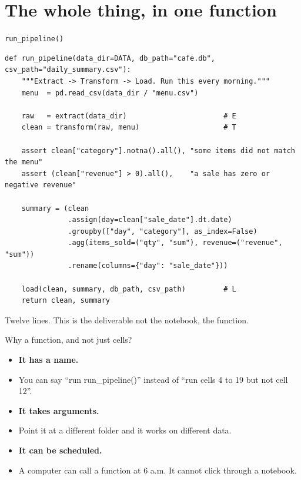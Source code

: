 \documentclass[aspectratio=169,10pt]{beamer}
\newcommand{\py}[1]{{\ttfamily\footnotesize\color{ink}#1}}
\begin{document}
\section{The whole thing, in one function}

\begin{frame}[fragile]{\texttt{run\_pipeline()}}
\begin{lstlisting}[basicstyle=\ttfamily\scriptsize]
def run_pipeline(data_dir=DATA, db_path="cafe.db", csv_path="daily_summary.csv"):
    """Extract -> Transform -> Load. Run this every morning."""
    menu  = pd.read_csv(data_dir / "menu.csv")

    raw   = extract(data_dir)                       # E
    clean = transform(raw, menu)                    # T

    assert clean["category"].notna().all(), "some items did not match the menu"
    assert (clean["revenue"] > 0).all(),    "a sale has zero or negative revenue"

    summary = (clean
               .assign(day=clean["sale_date"].dt.date)
               .groupby(["day", "category"], as_index=False)
               .agg(items_sold=("qty", "sum"), revenue=("revenue", "sum"))
               .rename(columns={"day": "sale_date"}))

    load(clean, summary, db_path, csv_path)         # L
    return clean, summary
\end{lstlisting}

  \pause
  \begin{aside}
    \small
    Twelve lines. \alert{This is the deliverable} \textemdash{} not the notebook, the function.
  \end{aside}
\end{frame}

\begin{frame}{Why a function, and not just cells?}
  \begin{itemize}[<+->]
    \item \textbf{It has a name.}
    \item You can say ``run \py{run\_pipeline()}'' instead of ``run cells 4 to 19 but not cell 12''.
    \item \textbf{It takes arguments.}
    \item Point it at a different folder and it works on different data.
    \item \textbf{It can be scheduled.}
    \item A computer can call a function at 6 a.m. It cannot click through a notebook.
  \end{itemize}
\end{frame}
\end{document}
